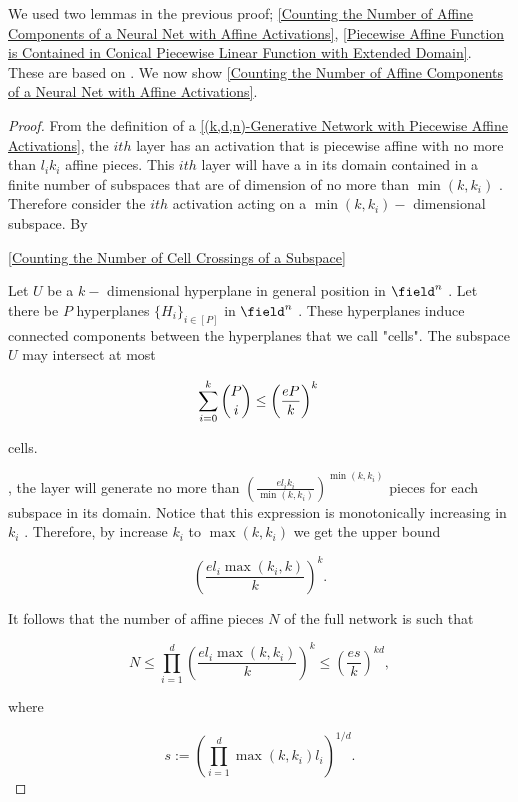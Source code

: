 \documentclass{article}
\begin{document}
We used two lemmas in the previous proof; \autoref{Counting the Number of Affine Components of a Neural Net with Affine Activations}, \autoref{Piecewise Affine Function is Contained in Conical Piecewise Linear Function with Extended Domain}. These are based on \cite{vershyninHighDimensionalProbabilityIntroduction2018}.
We now show \autoref{Counting the Number of Affine Components of a Neural Net with Affine Activations}.

\begin{proof}
    From the definition of a \autoref{(k,d,n)-Generative Network with Piecewise Affine Activations},  the  $ith$  layer has an activation that is piecewise affine with no more than  $l_i k_i$  affine pieces. This  $ith$  layer will have a in its domain contained in a finite number of subspaces that are of dimension of no more than  $\min(k,k_i)$ . Therefore consider the  $ith$  activation acting on a  $\min(k,k_i)-$ dimensional subspace. By

    \autoref{Counting the Number of Cell Crossings of a Subspace}


    \begin{lemma}
        \label{Counting the Number of Cell Crossings of a Subspace}
        Let  $U$  be a  $k-$ dimensional hyperplane in general position in  $\field^n$ . Let there be  $P$  hyperplanes  $\{ H_i \}_{i \in [P]}$  in  $\field^n$ . These hyperplanes induce connected components between the hyperplanes that we call "cells". The subspace  $U$  may intersect at most


        \begin{equation*}
            \sum_{i=0}^k {P \choose i} \leq \left( \frac{eP}{k} \right)^k   \\
        \end{equation*}

        cells.


    \end{lemma}


    , the layer will generate no more than  $\left( \frac{el_i k_i}{\min(k, k_i)} \right)^{\min(k,k_i)}$   pieces for each subspace in its domain. Notice that this expression is monotonically increasing in  $k_i$ . Therefore, by increase  $k_i$  to  $\max(k,k_i)$  we get the upper bound


    \begin{equation*}
        \left(  \frac{el_i \max(k_i, k)}{k} \right)^{k}.
    \end{equation*}

    It follows that the number of affine pieces  $N$  of the full network is such that


    \begin{equation*}
        N \leq \prod_{i=1}^d \left( \frac{el_i\max(k,k_i)}{k} \right)^k \leq \left(\frac{es}{k}\right)^{kd},
    \end{equation*}

    where


    \begin{equation*}
        s := \left( \prod_{i=1}^d \max(k, k_i)l_i \right)^{1/d}.
    \end{equation*}


\end{proof}
\end{document}
